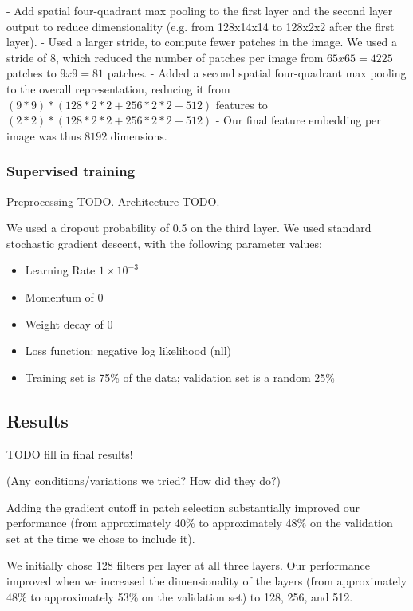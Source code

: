 \documentclass{article} %
\newenvironment{itemizedense}{
\begin{itemize}
  \setlength{\itemsep}{1pt}
  \setlength{\parskip}{0pt}
  \setlength{\parsep}{0pt}
}{\end{itemize}}
\begin{document}
- Add spatial four-quadrant max pooling to the first layer and the second layer output to reduce dimensionality (e.g. from 128x14x14 to 128x2x2 after the first layer).
- Used a larger stride, to compute fewer patches in the image. We used a stride of 8, which reduced the number of patches per image from $65x65=4225$ patches to $9x9 = 81$ patches.
- Added a second spatial four-quadrant max pooling to the overall representation, reducing it from $(9*9) * (128 * 2 * 2 + 256 * 2 * 2 + 512)$ features to $(2*2) * (128 * 2 * 2 + 256 * 2 * 2 + 512)$
- Our final feature embedding per image was thus $8192$ dimensions.

\subsubsection{Supervised training}

Preprocessing TODO. Architecture TODO.

We used a dropout probability of 0.5 on the third layer. We used standard stochastic gradient descent, with the following parameter values:

\begin{itemizedense}
\item Learning Rate $1 \times 10^{-3}$
\item Momentum of $0$
\item Weight decay of $0$
\item Loss function: negative log likelihood (nll)
\item Training set is 75\% of the data; validation set is a random 25\%
\end{itemizedense}

\subsection{Results}

TODO fill in final results!

(Any conditions/variations we tried? How did they do?)

Adding the gradient cutoff in patch selection substantially improved our performance (from approximately 40\% to approximately 48\% on the validation set at the time we chose to include it).

We initially chose 128 filters per layer at all three layers. Our performance improved when we increased the dimensionality of the layers (from approximately 48\% to approximately 53\% on the validation set) to 128, 256, and 512. 
\end{document}
